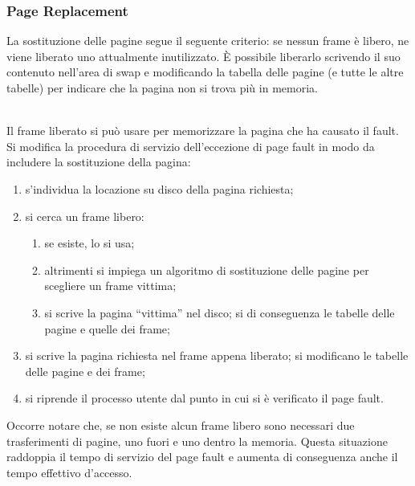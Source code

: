 \documentclass{article}
\begin{document}
			\subsubsection{Page Replacement}
				La sostituzione delle pagine segue il seguente criterio: se nessun frame è libero, ne viene liberato uno attualmente inutilizzato. È possibile liberarlo scrivendo il suo contenuto nell’area di swap e modificando la tabella delle pagine (e tutte le altre tabelle) per indicare che la pagina non si trova più in memoria. 
				\begin{figure}[ht!]
				\end{figure}
				\\Il frame liberato si può usare per memorizzare la pagina che ha causato il fault. Si modifica la procedura di servizio dell’eccezione di page fault in modo da includere la sostituzione della pagina:
				\begin{enumerate}
					\item s’individua la locazione su disco della pagina richiesta;
					\item si cerca un frame libero:
					\begin{enumerate}
						\item se esiste, lo si usa;
						\item altrimenti si impiega un algoritmo di sostituzione delle pagine per scegliere un frame vittima;
						\item si scrive la pagina “vittima” nel disco; si di conseguenza le tabelle delle pagine e quelle dei frame;
					\end{enumerate}
					\item si scrive la pagina richiesta nel frame appena liberato; si modificano le tabelle delle pagine e dei frame;
					\item si riprende il processo utente dal punto in cui si è verificato il page fault.
				\end{enumerate}
				Occorre notare che, se non esiste alcun frame libero sono necessari due trasferimenti di pagine, uno fuori e uno dentro la memoria. Questa situazione raddoppia il tempo di servizio del page fault e aumenta di conseguenza anche il tempo effettivo d’accesso.
\end{document}
